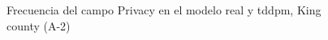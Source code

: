 \begin{figure}[H]
    \centering
    
    \caption{Frecuencia del campo Privacy en el modelo real y tddpm, King county (A-2)}
    \label{frecuency-tddpm-privacy}
\end{figure}